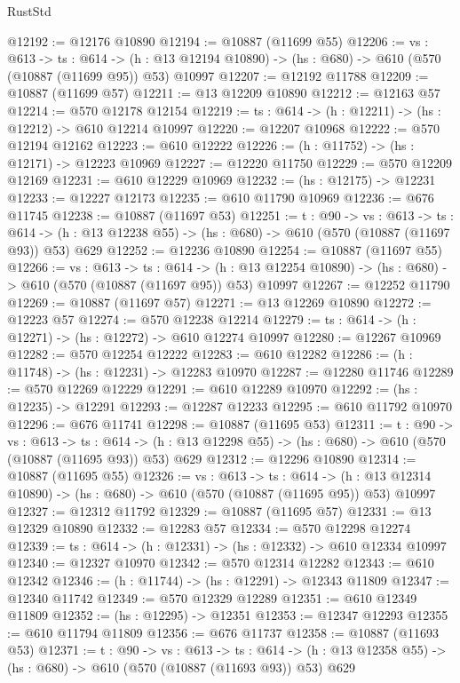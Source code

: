 \begin{lexlean}{RustStd}
\begin{coremodule}
@12192 := @12176 @10890
@12194 := @10887 (@11699 @55)
@12206 := {vs : @613} ->
  {ts : @614} ->
  (h : @13 @12194 @10890) -> (hs : @680) -> @610 (@570 (@10887 (@11699 @95)) @53) @10997
@12207 := @12192 @11788
@12209 := @10887 (@11699 @57)
@12211 := @13 @12209 @10890
@12212 := @12163 @57
@12214 := @570 @12178 @12154
@12219 := {ts : @614} -> (h : @12211) -> (hs : @12212) -> @610 @12214 @10997
@12220 := @12207 @10968
@12222 := @570 @12194 @12162
@12223 := @610 @12222
@12226 := (h : @11752) -> (hs : @12171) -> @12223 @10969
@12227 := @12220 @11750
@12229 := @570 @12209 @12169
@12231 := @610 @12229 @10969
@12232 := (hs : @12175) -> @12231
@12233 := @12227 @12173
@12235 := @610 @11790 @10969
@12236 := @676 @11745
@12238 := @10887 (@11697 @53)
@12251 := {t : @90} ->
  {vs : @613} ->
  {ts : @614} -> (h : @13 @12238 @55) -> (hs : @680) -> @610 (@570 (@10887 (@11697 @93)) @53) @629
@12252 := @12236 @10890
@12254 := @10887 (@11697 @55)
@12266 := {vs : @613} ->
  {ts : @614} ->
  (h : @13 @12254 @10890) -> (hs : @680) -> @610 (@570 (@10887 (@11697 @95)) @53) @10997
@12267 := @12252 @11790
@12269 := @10887 (@11697 @57)
@12271 := @13 @12269 @10890
@12272 := @12223 @57
@12274 := @570 @12238 @12214
@12279 := {ts : @614} -> (h : @12271) -> (hs : @12272) -> @610 @12274 @10997
@12280 := @12267 @10969
@12282 := @570 @12254 @12222
@12283 := @610 @12282
@12286 := (h : @11748) -> (hs : @12231) -> @12283 @10970
@12287 := @12280 @11746
@12289 := @570 @12269 @12229
@12291 := @610 @12289 @10970
@12292 := (hs : @12235) -> @12291
@12293 := @12287 @12233
@12295 := @610 @11792 @10970
@12296 := @676 @11741
@12298 := @10887 (@11695 @53)
@12311 := {t : @90} ->
  {vs : @613} ->
  {ts : @614} -> (h : @13 @12298 @55) -> (hs : @680) -> @610 (@570 (@10887 (@11695 @93)) @53) @629
@12312 := @12296 @10890
@12314 := @10887 (@11695 @55)
@12326 := {vs : @613} ->
  {ts : @614} ->
  (h : @13 @12314 @10890) -> (hs : @680) -> @610 (@570 (@10887 (@11695 @95)) @53) @10997
@12327 := @12312 @11792
@12329 := @10887 (@11695 @57)
@12331 := @13 @12329 @10890
@12332 := @12283 @57
@12334 := @570 @12298 @12274
@12339 := {ts : @614} -> (h : @12331) -> (hs : @12332) -> @610 @12334 @10997
@12340 := @12327 @10970
@12342 := @570 @12314 @12282
@12343 := @610 @12342
@12346 := (h : @11744) -> (hs : @12291) -> @12343 @11809
@12347 := @12340 @11742
@12349 := @570 @12329 @12289
@12351 := @610 @12349 @11809
@12352 := (hs : @12295) -> @12351
@12353 := @12347 @12293
@12355 := @610 @11794 @11809
@12356 := @676 @11737
@12358 := @10887 (@11693 @53)
@12371 := {t : @90} ->
  {vs : @613} ->
  {ts : @614} -> (h : @13 @12358 @55) -> (hs : @680) -> @610 (@570 (@10887 (@11693 @93)) @53) @629

\end{coremodule}
\end{lexlean}

